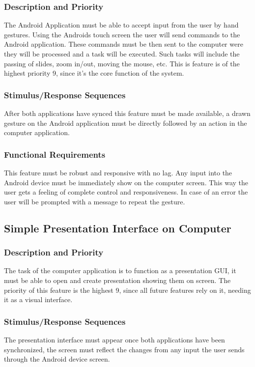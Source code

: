 \documentclass{article}
\begin{document}
\subsubsection{Description and Priority}
The Android Application must be able to accept input from the user by hand gestures. 
Using the Androids touch screen the user will send commands to the Android application. 
These commands must be then sent to the computer were they will be processed and a task will be executed. 
Such tasks will include the passing of slides, zoom in/out, moving the mouse, etc. 
This is feature is of the highest priority 9, since it’s the core function of the system.
\subsubsection{Stimulus/Response Sequences}
After both applications have synced this feature must be made available, a drawn gesture on the Android application must be directly followed by an action in the computer application.
\subsubsection{Functional Requirements}
This feature must be robust and responsive with no lag. 
Any input into the Android device must be immediately show on the computer screen. 
This way the user gets a feeling of complete control and responsiveness. 
In case of an error the user will be prompted with a message to repeat the gesture.

\subsection{Simple Presentation Interface on Computer}
\subsubsection{Description and Priority}
The task of the computer application is to function as a presentation GUI, it must be able to open and create presentation showing them on screen. 
The priority of this feature is the highest 9, since all future features rely on it, needing it as a visual interface.
\subsubsection{Stimulus/Response Sequences}
The presentation interface must appear once both applications have been synchronized, the screen must reflect the changes from any input the user sends through the Android device screen.
\end{document}
